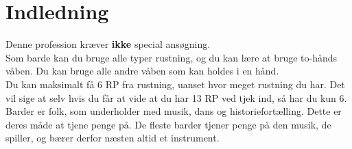 
\chapter{Indledning}

Denne profession kræver \textbf{ikke} special ansøgning.\\
Som barde kan du bruge alle typer rustning, og du kan lære at bruge to-hånds våben. Du kan bruge alle andre våben som kan holdes i en hånd.\\
Du kan maksimalt få 6 RP fra rustning, uanset hvor meget rustning du har. Det vil sige at selv hvis du får at vide at du har 13 RP ved tjek ind, så har du kun 6.\\

Barder er folk, som underholder med musik, dans og historiefortælling. Dette er deres måde at tjene penge på. De fleste barder tjener penge på den musik, de spiller, og bærer derfor næsten altid et instrument.
